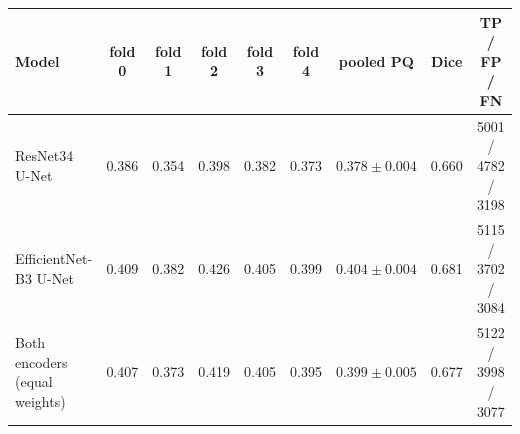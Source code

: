 \begin{tabular}{lcccccccc}
\toprule
Model & fold 0 & fold 1 & fold 2 & fold 3 & fold 4 & pooled PQ & Dice & TP / FP / FN \\
\midrule
ResNet34 U-Net & 0.386 & 0.354 & 0.398 & 0.382 & 0.373 & $0.378 \pm 0.004$ & 0.660 & 5001 / 4782 / 3198 \\
EfficientNet-B3 U-Net & 0.409 & 0.382 & 0.426 & 0.405 & 0.399 & $0.404 \pm 0.004$ & 0.681 & 5115 / 3702 / 3084 \\
Both encoders (equal weights) & 0.407 & 0.373 & 0.419 & 0.405 & 0.395 & $0.399 \pm 0.005$ & 0.677 & 5122 / 3998 / 3077 \\
\bottomrule
\end{tabular}
